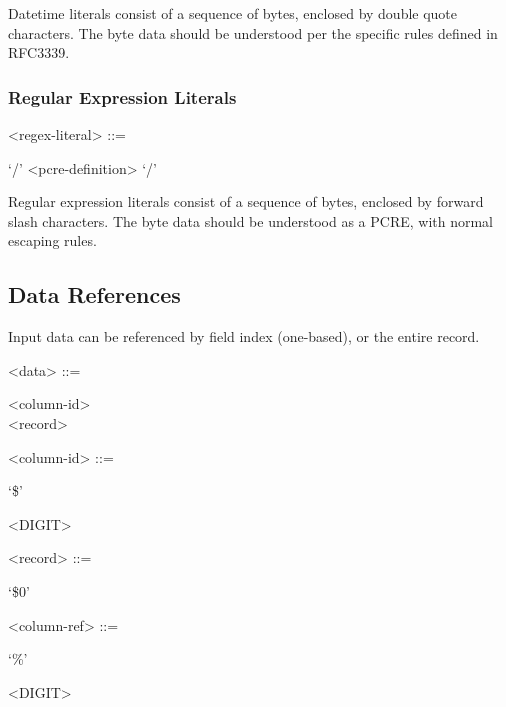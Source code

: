 Datetime literals consist of a sequence of bytes, enclosed by double
quote characters. The byte data should be understood per the specific
rules defined in RFC3339\cite{RFC3339}.

\subsubsection{Regular Expression Literals}

\begin{grammar}
  <regex-literal> ::= \begin{syntdiag}
    `/'
    <pcre-definition>
    `/'
  \end{syntdiag}
\end{grammar}

Regular expression literals consist of a sequence of bytes, enclosed by
forward slash characters. The byte data should be understood as a PCRE,
with normal escaping rules.

\subsection{Data References}

Input data can be referenced by field index (one-based), or the entire
record.

\begin{grammar}
  <data> ::= \begin{syntdiag}
    \begin{stack}
      <column-id> \\
      <record>
    \end{stack}
  \end{syntdiag}

  <column-id> ::= \begin{syntdiag}
    `\$'
    \begin{rep}
      <DIGIT>
    \end{rep}
  \end{syntdiag}

  <record> ::= \begin{syntdiag}
    `\$0'
  \end{syntdiag}

  <column-ref> ::= \begin{syntdiag}
    `\%'
    \begin{rep}
      <DIGIT>
    \end{rep}
  \end{syntdiag}
\end{grammar}

